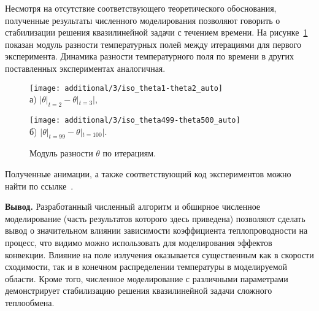 Несмотря на отсутствие соответствующего теоретического обоснования,
полученные результаты численного моделирования
позволяют говорить о стабилизации решения квазилинейной задачи с течением времени.
На рисунке~\ref{fig:4_3:time_diff} показан модуль разности температурных полей
между итерациями для первого эксперимента.
Динамика разности температурного поля по времени в других поставленных экспериментах аналогичная.
\begin{figure}[h!t]
    \begin{minipage}[b][][b]{0.49\linewidth}
        \centering
        \texttt{[image: additional/3/iso\_theta1-theta2\_auto]} \\ а) $|\theta|_{t=2} - \theta|_{t=3}|$,
    \end{minipage}
    \hfill
    \begin{minipage}[b][][b]{0.49\linewidth}
        \centering
        \texttt{[image: additional/3/iso\_theta499-theta500\_auto]} \\ б) $|\theta|_{t=99} - \theta|_{t=100}|$.
    \end{minipage}
    \caption{Модуль разности $\theta$ по итерациям.}
    \label{fig:4_3:time_diff}
\end{figure}


Полученные анимации, а также соответствующий код
экспериментов можно найти по ссылке~\cite{mesenev-github}.


\textbf{Вывод.}
Разработанный численный алгоритм и обширное численное моделирование
(часть результатов которого здесь приведена)
позволяют сделать вывод о значительном влиянии зависимости
коэффициента теплопроводности на процесс, что видимо можно
использовать для моделирования эффектов конвекции.
Влияние на поле излучения оказывается существенным как в скорости сходимости,
так и в конечном распределении температуры в моделируемой области.
Кроме того, численное моделирование с различными параметрами
демонстрирует стабилизацию решения квазилинейной задачи сложного теплообмена.

